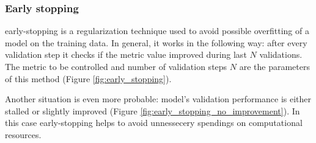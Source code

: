 \subsubsection*{Early stopping}

\Gls{early-stopping} is a regularization technique used to avoid
possible \gls{overfitting} of a model on the training data.
In general, it works in the following way: after every validation step
it checks if the metric value improved during last $N$ validations.
The metric to be controlled and number of validation steps $N$ are
the parameters of this method
(Figure \ref{fig:early_stopping}).

Another situation is even more probable: model's validation performance
is either stalled or slightly improved
(Figure \ref{fig:early_stopping_no_improvement}).
In this case \gls{early-stopping} helps to avoid unnessecery spendings
on computational resources.

